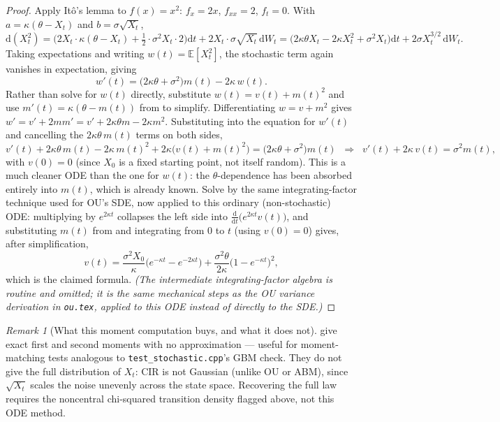 \documentclass[11pt]{article}
\newcommand{\E}{\mathbb{E}}
\newcommand{\dd}{\mathrm{d}}
\newcommand{\dW}{\dd W_t}
\newcommand{\dt}{\dd t}
\newcommand{\drift}{a}
\newcommand{\diff}{b}
\theoremstyle{plain}
\theoremstyle{definition}
\theoremstyle{remark}
\newtheorem{remark}{Remark}
\begin{document}
\begin{proof}
Apply It\^o's lemma to $f(x)=x^2$: $f_x=2x$, $f_{xx}=2$, $f_t=0$.
With $\drift=\kappa(\theta-X_t)$ and $\diff=\sigma\sqrt{X_t}$,
\[
   \dd(X_t^2)
     = \Big(2X_t\cdot\kappa(\theta-X_t) + \tfrac12\cdot\sigma^2 X_t\cdot 2\Big)\dt
       + 2X_t\cdot\sigma\sqrt{X_t}\,\dW
     = \big(2\kappa\theta X_t - 2\kappa X_t^2 + \sigma^2 X_t\big)\dt
       + 2\sigma X_t^{3/2}\,\dW .
\]
Taking expectations and writing $w(t)=\E[X_t^2]$, the stochastic term
again vanishes in expectation, giving
\[
   w'(t) = \big(2\kappa\theta+\sigma^2\big)m(t) - 2\kappa\,w(t).
\]
Rather than solve for $w(t)$ directly, substitute $w(t)=v(t)+m(t)^2$
and use $m'(t)=\kappa(\theta-m(t))$ from  to
simplify. Differentiating $w=v+m^2$ gives
$w'=v'+2mm'=v'+2\kappa\theta m-2\kappa m^2$. Substituting into the
equation for $w'(t)$ and cancelling the $2\kappa\theta\,m(t)$ terms on
both sides,
\[
   v'(t) + 2\kappa\theta\,m(t) - 2\kappa\,m(t)^2 + 2\kappa\big(v(t)+m(t)^2\big)
     = \big(2\kappa\theta+\sigma^2\big)m(t)
   \;\;\Longrightarrow\;\;
   v'(t) + 2\kappa\,v(t) = \sigma^2 m(t),
\]
with $v(0)=0$ (since $X_0$ is a fixed starting point, not itself
random). This is a much cleaner ODE than the one for $w(t)$: the
$\theta$-dependence has been absorbed entirely into $m(t)$, which is
already known. Solve by the same integrating-factor technique used
for OU's SDE, now applied to this ordinary (non-stochastic) ODE:
multiplying by $e^{2\kappa t}$ collapses the left side into
$\tfrac{\dd}{\dd t}\big(e^{2\kappa t}v(t)\big)$, and substituting
$m(t)$ from  and integrating from $0$ to $t$
(using $v(0)=0$) gives, after simplification,
\[
   v(t) = \frac{\sigma^2 X_0}{\kappa}\big(e^{-\kappa t}-e^{-2\kappa t}\big)
        + \frac{\sigma^2\theta}{2\kappa}\big(1-e^{-\kappa t}\big)^2,
\]
which is the claimed formula. \emph{(The intermediate integrating-factor
algebra is routine and omitted; it is the same mechanical steps as the
OU variance derivation in \texttt{ou.tex}, applied to this ODE instead
of directly to the SDE.)}
\end{proof}

\begin{remark}[What this moment computation buys, and what it does not]
 give exact first and second moments
with no approximation --- useful for moment-matching tests analogous
to \texttt{test\_stochastic.cpp}'s GBM check. They do not give
the full distribution of $X_t$: CIR is not Gaussian (unlike OU or
ABM), since $\sqrt{X_t}$ scales the noise unevenly across the state
space. Recovering the full law requires the noncentral chi-squared
transition density flagged above, not this ODE method.
\end{remark}
\end{document}
